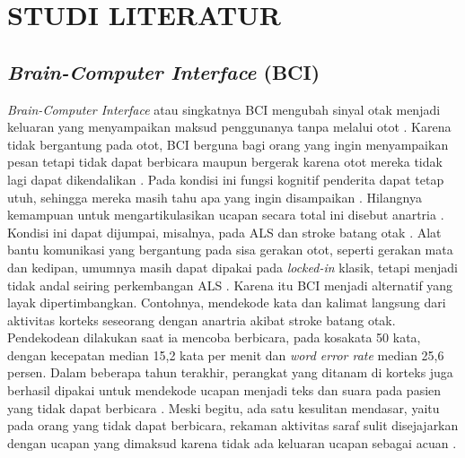 \cleardoublepage %
\chapter{STUDI LITERATUR}
\label{chap:studi-literatur}


\section{\textit{Brain-Computer Interface} (BCI)}
\label{sec:bci}
\textit{Brain-Computer Interface} atau singkatnya BCI mengubah sinyal otak menjadi keluaran yang menyampaikan maksud penggunanya tanpa melalui otot \parencite{shih2012}.
Karena tidak bergantung pada otot, BCI berguna bagi orang yang ingin menyampaikan pesan tetapi tidak dapat berbicara maupun bergerak karena otot mereka tidak lagi dapat dikendalikan \parencite{nicolasalonso2012}.
Pada kondisi ini fungsi kognitif penderita dapat tetap utuh, sehingga mereka masih tahu apa yang ingin disampaikan \parencite{he2026}.
Hilangnya kemampuan untuk mengartikulasikan ucapan secara total ini disebut anartria \parencite{moses2021}.
Kondisi ini dapat dijumpai, misalnya, pada ALS dan stroke batang otak \parencite{he2026}.
Alat bantu komunikasi yang bergantung pada sisa gerakan otot, seperti gerakan mata dan kedipan, umumnya masih dapat dipakai pada \textit{locked-in} klasik, tetapi menjadi tidak andal seiring perkembangan ALS \parencite{canny2023}.
Karena itu BCI menjadi alternatif yang layak dipertimbangkan.
Contohnya, \textcite{moses2021} mendekode kata dan kalimat langsung dari aktivitas korteks seseorang dengan anartria akibat stroke batang otak.
Pendekodean dilakukan saat ia mencoba berbicara, pada kosakata 50 kata, dengan kecepatan median 15,2 kata per menit dan \textit{word error rate} median 25,6 persen.
Dalam beberapa tahun terakhir, perangkat yang ditanam di korteks juga berhasil dipakai untuk mendekode ucapan menjadi teks dan suara pada pasien yang tidak dapat berbicara \parencite{khan2025}.
Meski begitu, ada satu kesulitan mendasar, yaitu pada orang yang tidak dapat berbicara, rekaman aktivitas saraf sulit disejajarkan dengan ucapan yang dimaksud karena tidak ada keluaran ucapan sebagai acuan \parencite{moses2021}.

